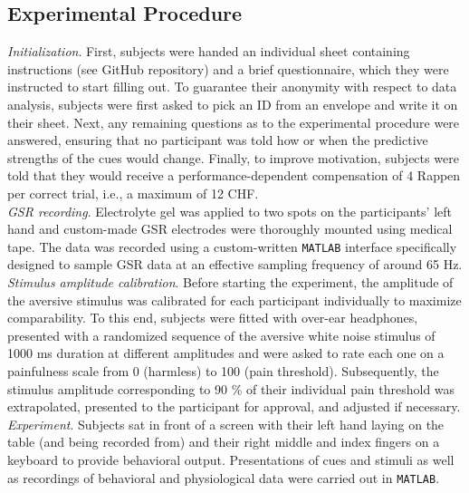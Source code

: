 \documentclass{article}
\begin{document}
\begin{multicols}{2}
\subsection*{Experimental Procedure}

\textit{Initialization}. First, subjects were handed an individual sheet containing instructions (see GitHub repository) and a brief questionnaire, which they were instructed to start filling out. To guarantee their anonymity with respect to data analysis, subjects were first asked to pick an ID from an envelope and write it on their sheet. Next, any remaining questions as to the experimental procedure were answered, ensuring that no participant was told how or when the predictive strengths of the cues would change. Finally, to improve motivation, subjects were told that they would receive a performance-dependent compensation of 4 Rappen per correct trial, i.e., a maximum of 12 CHF. \\
\textit{GSR recording}. Electrolyte gel was applied to two spots on the participants’ left hand and custom-made GSR electrodes were thoroughly mounted using medical tape. The data was recorded using a custom-written \texttt{MATLAB} interface specifically designed to sample GSR data at an effective sampling frequency of around 65 Hz. \\ 
\textit{Stimulus amplitude calibration}. Before starting the experiment, the amplitude of the aversive stimulus was calibrated for each participant individually to maximize comparability. To this end, subjects were fitted with over-ear headphones, presented with a randomized sequence of the aversive white noise stimulus of 1000 ms duration at different amplitudes and were asked to rate each one on a painfulness scale from 0 (harmless) to 100 (pain threshold). Subsequently, the stimulus amplitude corresponding to 90 \% of their individual pain threshold was extrapolated, presented to the participant for approval, and adjusted if necessary.\\
\textit{Experiment}. Subjects sat in front of a screen with their left hand laying on the table (and being recorded from) and their right middle and index fingers on a keyboard to provide behavioral output. Presentations of cues and stimuli as well as recordings of behavioral and physiological data were carried out in \texttt{MATLAB}.\\


\end{multicols}
\end{document}
